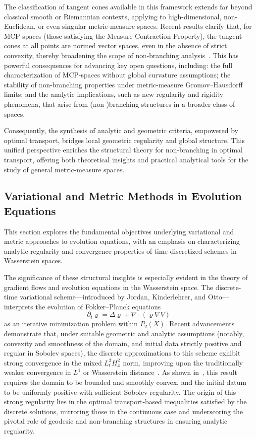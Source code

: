 \documentclass[sigconf]{acmart}
\begin{document}
The classification of tangent cones available in this framework extends far beyond classical smooth or Riemannian contexts, applying to high-dimensional, non-Euclidean, or even singular metric-measure spaces. Recent results clarify that, for MCP-spaces (those satisfying the Measure Contraction Property), the tangent cones at all points are normed vector spaces, even in the absence of strict convexity, thereby broadening the scope of non-branching analysis~\cite{ref107}. This has powerful consequences for advancing key open questions, including: the full characterization of MCP-spaces without global curvature assumptions; the stability of non-branching properties under metric-measure Gromov--Hausdorff limits; and the analytic implications, such as new regularity and rigidity phenomena, that arise from (non-)branching structures in a broader class of spaces.

Consequently, the synthesis of analytic and geometric criteria, empowered by optimal transport, bridges local geometric regularity and global structure. This unified perspective enriches the structural theory for non-branching in optimal transport, offering both theoretical insights and practical analytical tools for the study of general metric-measure spaces.

\subsection{Variational and Metric Methods in Evolution Equations}

This section explores the fundamental objectives underlying variational and metric approaches to evolution equations, with an emphasis on characterizing analytic regularity and convergence properties of time-discretized schemes in Wasserstein spaces.

The significance of these structural insights is especially evident in the theory of gradient flows and evolution equations in the Wasserstein space. The discrete-time variational scheme—introduced by Jordan, Kinderlehrer, and Otto—interprets the evolution of Fokker--Planck equations
\[
\partial_t \varrho = \Delta \varrho + \nabla\cdot(\varrho \nabla V)
\]
as an iterative minimization problem within $P_2(X)$. Recent advancements demonstrate that, under suitable geometric and analytic assumptions (notably, convexity and smoothness of the domain, and initial data strictly positive and regular in Sobolev spaces), the discrete approximations to this scheme exhibit strong convergence in the mixed $L^2_t H^2_x$ norm, improving upon the traditionally weaker convergence in $L^1$ or Wasserstein distance~\cite{ref96}. As shown in~\cite{ref96}, this result requires the domain to be bounded and smoothly convex, and the initial datum to be uniformly positive with sufficient Sobolev regularity. The origin of this strong regularity lies in the optimal transport-based inequalities satisfied by the discrete solutions, mirroring those in the continuous case and underscoring the pivotal role of geodesic and non-branching structures in ensuring analytic regularity.
\end{document}
